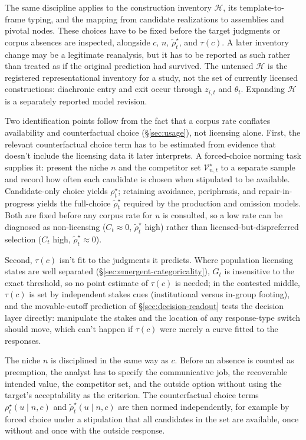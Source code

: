 The same discipline applies to the construction inventory $\mathcal H$, its
template-to-frame typing, and the mapping from candidate realizations to
assemblies and pivotal nodes. These choices have to be fixed before the target
judgments or corpus absences are inspected, alongside $c$, $n$,
$\widetilde{\rho}_t^\star$, and $\tau(c)$. A later inventory change may be a
legitimate reanalysis, but it has to be reported as such rather than treated as if
the original prediction had survived. The untensed $\mathcal H$ is the
registered representational inventory for a study, not the set of currently
licensed constructions: diachronic entry and exit occur through $z_{i,t}$ and
$\theta_t$. Expanding $\mathcal H$ is a separately reported model revision.

Two identification points follow from the fact that a corpus rate conflates
availability and counterfactual choice (\S\ref{sec:usage}), not licensing alone.
First, the relevant counterfactual choice term has to be estimated from evidence that
doesn't include the licensing data it later interprets. A forced-choice norming
task supplies it: present the niche $n$ and the competitor set
$\mathcal{V}_{n,t}^{\star}$ to a separate sample and record how often each
candidate is chosen when stipulated to be available. Candidate-only choice
yields $\rho_t^\star$; retaining avoidance, periphrasis, and repair-in-progress
yields the full-choice $\widetilde{\rho}_t^\star$ required by the production and
omission models. Both are fixed before any corpus rate for $u$ is consulted, so
a low rate can be diagnosed as non-licensing ($C_t\!\approx\!0$,
$\widetilde{\rho}_t^\star$ high) rather than licensed-but-dispreferred selection
($C_t$ high, $\widetilde{\rho}_t^\star\!\approx\!0$).

Second, $\tau(c)$ isn't fit to the judgments it predicts. Where population
licensing states are well separated (\S\ref{sec:emergent-categoricality}), $G_t$ is insensitive
to the exact threshold, so no point estimate of $\tau(c)$ is needed; in the
contested middle, $\tau(c)$ is set by independent stakes cues (institutional
versus in-group footing), and the movable-cutoff prediction of
\S\ref{sec:decision-readout} tests the decision layer directly: manipulate the
stakes and the location of any response-type switch should move, which can't
happen if $\tau(c)$ were merely a curve fitted to the responses.

The niche $n$ is disciplined in the same way as $c$. Before an absence is counted
as preemption, the analyst has to specify the communicative job, the recoverable
intended value, the competitor set, and the outside option without using the
target's acceptability as the criterion. The counterfactual choice terms
$\rho_t^\star(u\mid n,c)$ and $\widetilde{\rho}_t^\star(u\mid n,c)$ are then
normed independently, for example by forced choice under a stipulation that all
candidates in the set are available, once without and once with the outside
response.

